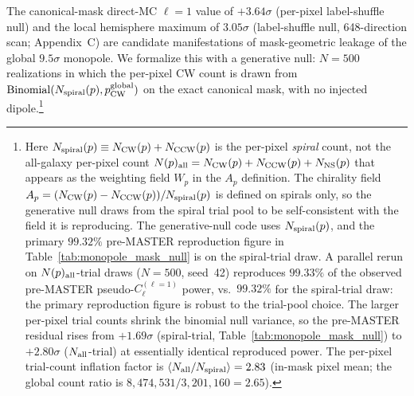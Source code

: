 \documentclass[aps,prd,twocolumn,superscriptaddress,preprintnumbers,nofootinbib,longbibliography,floatfix]{revtex4-2}
\newcommand{\sigmaunit}{\sigma}
\begin{document}
The canonical-mask direct-MC $\ell\!=\!1$ value of $+3.64\sigmaunit$ (per-pixel label-shuffle null) and the local hemisphere maximum of $3.05\sigmaunit$ (label-shuffle null, 648-direction scan; Appendix~C) are candidate manifestations of mask-geometric leakage of the global $9.5\sigmaunit$ monopole. We formalize this with a generative null: $N\!=\!500$ realizations in which the per-pixel CW count is drawn from $\mathrm{Binomial}(N_{\rm spiral}(p), p_{\rm CW}^{\rm global})$ on the exact canonical mask, with no injected dipole.\footnote{\label{fn:binomial_nspiral}Here $N_{\rm spiral}(p) \equiv N_{\rm CW}(p) + N_{\rm CCW}(p)$ is the per-pixel \emph{spiral} count, not the all-galaxy per-pixel count $N(p)_{\rm all}=N_{\rm CW}(p)+N_{\rm CCW}(p)+N_{\rm NS}(p)$ that appears as the weighting field $W_p$ in the $A_p$ definition. The chirality field $A_p = (N_{\rm CW}(p) - N_{\rm CCW}(p))/N_{\rm spiral}(p)$ is defined on spirals only, so the generative null draws from the spiral trial pool to be self-consistent with the field it is reproducing. The generative-null code uses $N_{\rm spiral}(p)$, and the primary $99.32\%$ pre-MASTER reproduction figure in Table~\ref{tab:monopole_mask_null} is on the spiral-trial draw. A parallel rerun on $N(p)_{\rm all}$-trial draws ($N\!=\!500$, seed~42) reproduces $99.33\%$ of the observed pre-MASTER pseudo-$C_\ell^{(\ell=1)}$ power, vs.\ $99.32\%$ for the spiral-trial draw: the primary reproduction figure is robust to the trial-pool choice. The larger per-pixel trial counts shrink the binomial null variance, so the pre-MASTER residual rises from $+1.69\sigmaunit$ (spiral-trial, Table~\ref{tab:monopole_mask_null}) to $+2.80\sigmaunit$ ($N_{\rm all}$-trial) at essentially identical reproduced power. The per-pixel trial-count inflation factor is $\langle N_{\rm all}/N_{\rm spiral}\rangle = 2.83$ (in-mask pixel mean; the global count ratio is $8{,}474{,}531/3{,}201{,}160 = 2.65$).}
\end{document}
